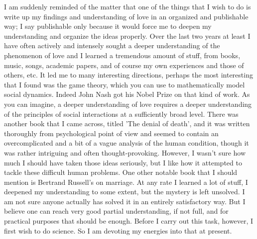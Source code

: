 \documentclass[11pt,a4paper]{article}
\begin{document}
I am suddenly reminded of the matter that one of the things that I wish to do is write up my findings and understanding of love in an organized and publishable way; I say publishable only because it would force me to deepen my understanding and organize the ideas properly. Over the last two years at least I have often actively and intensely sought a deeper understanding of the phenomenon of love and I learned a tremendous amount of stuff, from books, music, songs, academic papers, and of course my own experiences and those of others, etc. It led me to many interesting directions, perhaps the most interesting that I found was the game theory, which you can use to mathematically model social dynamics. Indeed John Nash got his Nobel Prize on that kind of work. As you can imagine, a deeper understanding of love requires a deeper understanding of the principles of social interactions at a sufficiently broad level. There was another book that I came across, titled 'The denial of death', and it was written thoroughly from psychological point of view and seemed to contain an overcomplicated and a bit of a vague analysis of the human condition, though it was rather intriguing and often thought-provoking. However, I wasn't sure how much I should have taken those ideas seriously, but I like how it attempted to tackle these difficult human problems. One other notable book that I should mention is Bertrand Russell's on marriage. At any rate I learned a lot of stuff, I deepened my understanding to some extent, but the mystery is left unsolved. I am not sure anyone actually has solved it in an entirely satisfactory way. But I believe one can reach very good partial understanding, if not full, and for practical purposes that should be enough. Before I carry out this task, however, I first wish to do science. So I am devoting my energies into that at present. 
\end{document}
